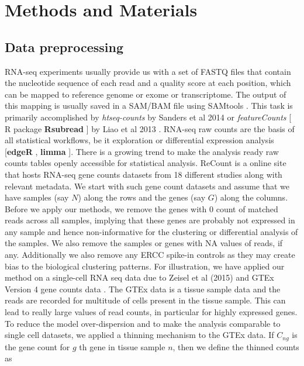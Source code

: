 \section{Methods and Materials}

\subsection{Data preprocessing}

RNA-seq experiments usually provide us with a set of FASTQ files that contain the nucleotide sequence of each read and a quality score at each position, which can be mapped to  reference genome or exome or transcriptome. The output of this mapping is usually saved in a SAM/BAM file using SAMtools  \cite{Li2009} . This task is primarily accomplished by \textit {htseq-counts}  by Sanders et al  2014 \cite{Sanders2014} or \textit{featureCounts}  [ R package \textbf{Rsubread} ] by Liao et al 2013 \cite{Liao2013}.  RNA-seq raw counts are the basis of all statistical workflows, be it exploration or differential expression analysis [\textbf{edgeR} \cite{Robinson2010}, \textbf{limma} \cite{Ritchie2015} ]. There is a growing trend to make the analysis ready raw counts tables openly accessible for statistical analysis. ReCount is a online site that hosts RNA-seq gene counts datasets from 18 different studies \cite{Frazee2011} along with relevant metadata. We start with such gene count datasets and assume that we have samples (say $N$)  along the rows and the genes  (say $G$) along the columns. Before we apply our methods, we remove the genes with 0 count of matched reads across all samples, implying that these genes are probably not expressed in any sample and hence non-informative for the clustering or differential analysis of the samples. We also remove the samples or genes with NA values of reads, if any. Additionally we also remove any ERCC spike-in controls as they may create bias to the biological clustering patterns.  For illustration, we have applied our method on a single-cell RNA seq data  due to Zeisel et al (2015) \cite{Zeisel2015} and GTEx Version 4 gene counts data \cite{GTEX2013}. The GTEx data is a tissue sample data and the reads are recorded for multitude of cells present in the tissue sample. This can lead to really large values of read counts, in particular for highly expressed genes. To reduce the model over-dispersion and to make the analysis comparable to single cell datasets, we applied a thinning  mechanism to the GTEx data. If $C_{ng}$ is the gene count for $g$ th gene in tissue sample $n$, then we define the thinned counts as 

